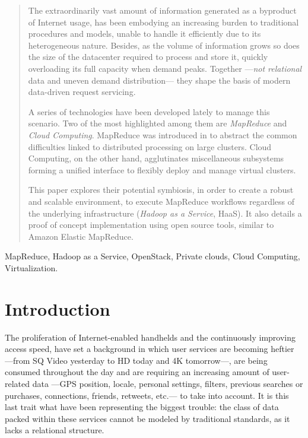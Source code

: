 \documentclass[conference]{IEEEtran}
\begin{document}
\begin{abstract}
The extraordinarily vast amount of information generated as a byproduct of Internet usage, has been embodying an increasing burden to traditional procedures and models, unable to handle it efficiently due to its heterogeneous nature. Besides, as the volume of information grows so does the size of the datacenter required to process and store it, quickly overloading its full capacity when demand peaks. Together ---\emph{not relational} data and uneven demand distribution--- they shape the basis of modern data-driven request servicing.

A series of technologies have been developed lately to manage this scenario. Two of the most highlighted among them are \emph{MapReduce} and \emph{Cloud Computing}. MapReduce was introduced in \cite{Dean:2004:MSD:1251254.1251264} to abstract the common difficulties linked to distributed processing on large clusters. Cloud Computing, on the other hand, agglutinates miscellaneous subsystems forming a unified interface to flexibly deploy and manage virtual clusters.

This paper explores their potential symbiosis, in order to create a robust and scalable environment, to execute MapReduce workflows regardless of the underlying infrastructure (\emph{Hadoop as a Service}, HaaS). It also details a proof of concept implementation using open source tools, similar to Amazon Elastic MapReduce.
\end{abstract}


\begin{IEEEkeywords}
 MapReduce, Hadoop as a Service, OpenStack, Private clouds, Cloud Computing, Virtualization.
\end{IEEEkeywords}




\section{Introduction}\label{sec:int}
\noindent The proliferation of Internet-enabled handhelds and the continuously improving access speed, have set a background in which user services are becoming heftier ---from SQ Video yesterday to HD today and 4K tomorrow---, are being consumed throughout the day and are requiring an increasing amount of user-related data ---GPS position, locale, personal settings, filters, previous searches or purchases, connections, friends, retweets, etc.--- to take into account. It is this last trait what have been representing the biggest trouble: the class of data packed within these services cannot be modeled by traditional standards, as it lacks a relational structure.
\end{document}
